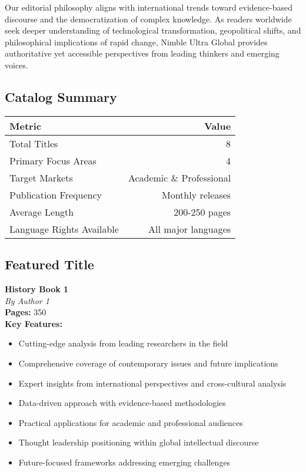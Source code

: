 \documentclass[11pt]{article}
\begin{document}
Our editorial philosophy aligns with international trends toward evidence-based discourse and the democratization of complex knowledge. As readers worldwide seek deeper understanding of technological transformation, geopolitical shifts, and philosophical implications of rapid change, Nimble Ultra Global provides authoritative yet accessible perspectives from leading thinkers and emerging voices.

\subsection{Catalog Summary}

\begin{center}
\begin{tabular}{|l|r|}
\hline
\textbf{Metric} & \textbf{Value} \\
\hline
Total Titles & 8 \\
Primary Focus Areas & 4 \\
Target Markets & Academic \& Professional \\
Publication Frequency & Monthly releases \\
Average Length & 200-250 pages \\
Language Rights Available & All major languages \\
\hline
\end{tabular}
\end{center}

\subsection{Featured Title}

\textbf{History Book 1}\\
\textit{By Author 1} \\[0.4cm]

\textbf{Pages:} 350\\[0.3cm]

\textbf{Key Features:}
\begin{itemize}
\item Cutting-edge analysis from leading researchers in the field
\item Comprehensive coverage of contemporary issues and future implications
\item Expert insights from international perspectives and cross-cultural analysis
\item Data-driven approach with evidence-based methodologies
\item Practical applications for academic and professional audiences
\item Thought leadership positioning within global intellectual discourse
\item Future-focused frameworks addressing emerging challenges
\end{itemize}
\end{document}
